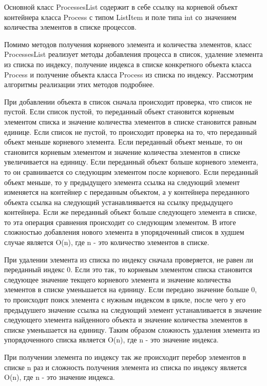 \documentclass[russian,utf8,simple,hpadding=10mm,vpadding=20mm]{eskdtext}
\begin{document}
Основной класс ProcessesList содержит в себе ссылку на корневой объект контейнера класса Process с типом ListItem и поле типа int со значением количества элементов в списке процессов. 

Помимо методов получения корневого элемента и количества элементов, класс ProcessesList реализует методы добавления процесса в список, удаление элемента из списка по индексу, получение индекса в списке конкретного объекта класса Process и получение объекта класса Process из списка по индексу. Рассмотрим алгоритмы реализации этих методов подробнее.

При добавлении объекта в список сначала происходит проверка, что список не пустой. Если список пустой, то переданный объект становится корневым элементом списка и значение количества элементов в списке становится равным единице. Если список не пустой, то происходит проверка на то, что переданный объект меньше корневого элемента. Если переданный объект меньше, то он становится корневым элементом и значение количества элементов в списке увеличивается на единицу. Если переданный объект больше корневого элемента, то он сравнивается со следующим элементом после корневого. Если переданный объект меньше, то у предыдущего элемента ссылка на следующий элемент изменяется на контейнер с переданным объектом, а у контейнера переданного объекта ссылка на следующий устанавлиявается на ссылку предыдущего контейнера. Если же переданный объект больше следующего элемента в списке, то эта операция сравнения происходит со следующим элементом. В итоге сложностью добавления нового элемента в упорядоченный список в худшем случае является O(n), где n - это количество элементов в списке.

При удалении элемента из списка по индексу сначала проверяется, не равен ли переданный индекс 0. Если это так, то корневым элементом списка становится следующее значение текщего корневого элемента и значение количества элементов в списке уменьшается на единицу. Если передано значение больше 0, то происходит поиск элемента с нужным индексом в цикле, после чего у его предыдушего значение ссылка на следующий элемент устанавливается в значение следующего элемента найденного объекта и значение количества элементов в списке уменьшается на единицу. Таким образом сложность удаления элемента из упорядоченного списка является O(n), где n - это значение индекса.

При получении элемента по индексу так же происходит перебор элементов в списке n раз и сложность получения элемента из списка по индексу является O(n), где n - это значение индекса.
\end{document}
